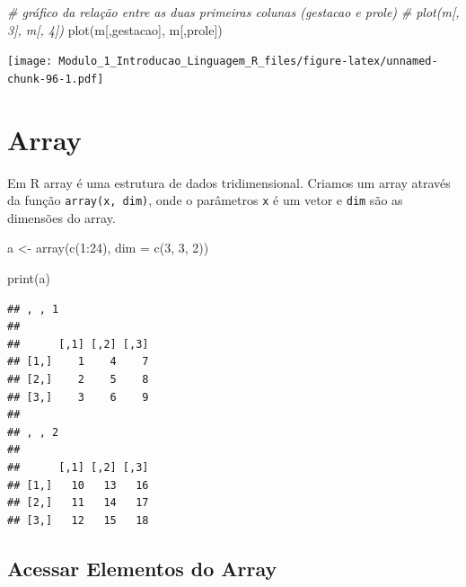\documentclass[
]{article}
\newenvironment{Shaded}{\begin{snugshade}}{\end{snugshade}}
\newcommand{\AttributeTok}[1]{\textcolor[rgb]{0.77,0.63,0.00}{#1}}
\newcommand{\CommentTok}[1]{\textcolor[rgb]{0.56,0.35,0.01}{\textit{#1}}}
\newcommand{\DecValTok}[1]{\textcolor[rgb]{0.00,0.00,0.81}{#1}}
\newcommand{\FunctionTok}[1]{\textcolor[rgb]{0.00,0.00,0.00}{#1}}
\newcommand{\NormalTok}[1]{#1}
\newcommand{\OtherTok}[1]{\textcolor[rgb]{0.56,0.35,0.01}{#1}}
\newcommand{\SpecialCharTok}[1]{\textcolor[rgb]{0.00,0.00,0.00}{#1}}
\newcommand{\StringTok}[1]{\textcolor[rgb]{0.31,0.60,0.02}{#1}}
\begin{document}
\begin{Shaded}
\begin{Highlighting}[]
\CommentTok{\# gráfico da relação entre as duas primeiras colunas (gestacao e prole) }
\CommentTok{\# plot(m[, 3], m[, 4])}
\FunctionTok{plot}\NormalTok{(m[,}\StringTok{\textquotesingle{}gestacao\textquotesingle{}}\NormalTok{], m[,}\StringTok{\textquotesingle{}prole\textquotesingle{}}\NormalTok{])}
\end{Highlighting}
\end{Shaded}

\texttt{[image: Modulo\_1\_Introducao\_Linguagem\_R\_files/figure-latex/unnamed-chunk-96-1.pdf]}

\hypertarget{array}{%
\section{Array}\label{array}}

Em R array é uma estrutura de dados tridimensional. Criamos um array
através da função \texttt{array(x,\ dim)}, onde o parâmetros \texttt{x}
é um vetor e \texttt{dim} são as dimensões do array.

\begin{Shaded}
\begin{Highlighting}[]
\NormalTok{a }\OtherTok{\textless{}{-}} \FunctionTok{array}\NormalTok{(}\FunctionTok{c}\NormalTok{(}\DecValTok{1}\SpecialCharTok{:}\DecValTok{24}\NormalTok{), }\AttributeTok{dim =} \FunctionTok{c}\NormalTok{(}\DecValTok{3}\NormalTok{, }\DecValTok{3}\NormalTok{, }\DecValTok{2}\NormalTok{))}
\end{Highlighting}
\end{Shaded}

\begin{Shaded}
\begin{Highlighting}[]
\FunctionTok{print}\NormalTok{(a)}
\end{Highlighting}
\end{Shaded}

\begin{verbatim}
## , , 1
## 
##      [,1] [,2] [,3]
## [1,]    1    4    7
## [2,]    2    5    8
## [3,]    3    6    9
## 
## , , 2
## 
##      [,1] [,2] [,3]
## [1,]   10   13   16
## [2,]   11   14   17
## [3,]   12   15   18
\end{verbatim}

\hypertarget{acessar-elementos-do-array}{%
\subsection{Acessar Elementos do
Array}\label{acessar-elementos-do-array}}
\end{document}

